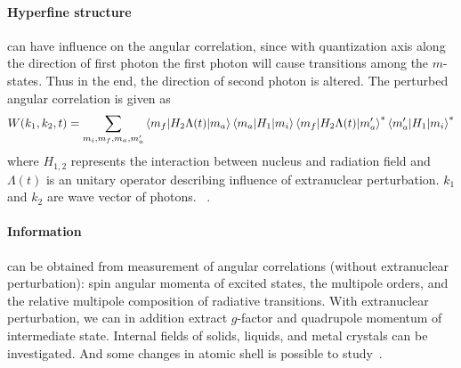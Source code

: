 \paragraph{Hyperfine structure} can have influence on the angular correlation, since with quantization axis along the direction of first photon the first photon will cause transitions among the $m$-states. Thus in the end, the direction of second photon is altered. The perturbed angular correlation is given as
\begin{equation}
   W(k_1, k_2, t) = \sum_{m_i, m_f, m_a, m'_a} \braket{m_f | H_2 \Lambda(t) | m_a} \braket{m_a | H_1 | m_i} \braket{m_f | H_2 \Lambda(t) | m'_a}^* \braket{m'_a | H_1 | m_i}^*
\end{equation}
where $H_{1,2}$ represents the interaction between nucleus and radiation field and $\Lambda(t)$ is an unitary operator describing influence of extranuclear perturbation. $k_1$ and $k_2$ are wave vector of photons.
~\cite{siegbahn}.


\paragraph{Information} can be obtained from measurement of \gag angular correlations (without extranuclear perturbation): spin angular momenta of excited states, the multipole orders, and the relative multipole composition of radiative transitions\cite{RAWilson}. With extranuclear perturbation, we can in addition extract $g$-factor and quadrupole momentum of intermediate state. Internal fields of solids, liquids, and metal crystals can be investigated. And some changes in atomic shell is possible to study~\cite{siegbahn}.



